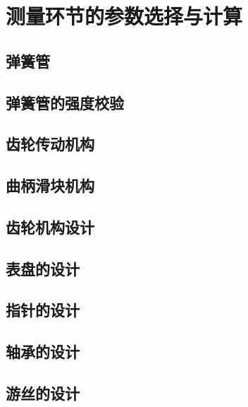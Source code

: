\section{测量环节的参数选择与计算}
\subsection{弹簧管}
\subsection{弹簧管的强度校验}
\subsection{齿轮传动机构}
\subsection{曲柄滑块机构}
\subsection{齿轮机构设计}
\subsection{表盘的设计}
\subsection{指针的设计}
\subsection{轴承的设计}
\subsection{游丝的设计}